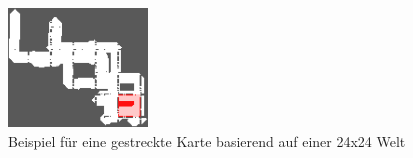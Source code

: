 \begin{figure}
	\includegraphics[width=140px]{bilder/karte3.png}
	\centering
	\caption{Beispiel für eine gestreckte Karte basierend auf einer 24x24 Welt }
	\label{fig:kartenwiederholung}
\end{figure}




	



